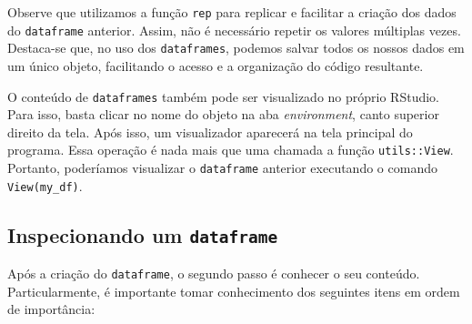 \documentclass[
  11pt,
]{book}
\newenvironment{rmdimportant}
{\begin{importantblock}

	} {\end{importantblock}}
\begin{document}
Observe que utilizamos a função \texttt{rep} para replicar e facilitar a criação dos dados do \texttt{dataframe} anterior. Assim, não é necessário repetir os valores múltiplas vezes. Destaca-se que, no uso dos \texttt{dataframes}, podemos salvar todos os nossos dados em um único objeto, facilitando o acesso e a organização do código resultante.

\begin{rmdimportant}
O conteúdo de \texttt{dataframes} também pode ser visualizado no próprio
RStudio. Para isso, basta clicar no nome do objeto na aba
\emph{environment}, canto superior direito da tela. Após isso, um
visualizador aparecerá na tela principal do programa. Essa operação é
nada mais que uma chamada a função \texttt{utils::View}. Portanto,
poderíamos visualizar o \texttt{dataframe} anterior executando o comando
\texttt{View(my\_df)}.
\end{rmdimportant}


\hypertarget{inspecionando-um-dataframe}{%
\subsection{\texorpdfstring{Inspecionando um \texttt{dataframe}}{Inspecionando um dataframe}}\label{inspecionando-um-dataframe}}

Após a criação do \texttt{dataframe}, o segundo passo é conhecer o seu conteúdo. Particularmente, é importante tomar conhecimento dos seguintes itens em ordem de importância:
\end{document}
